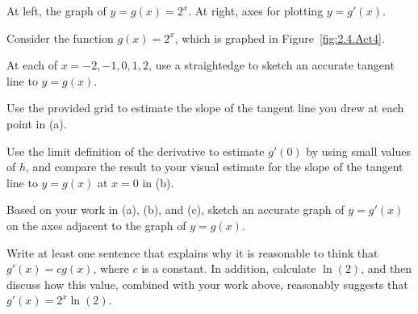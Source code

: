 \begin{marginfigure}[8cm]
\caption{At left, the graph of $y = g(x) = 2^x$. At right, axes for plotting $y = g'(x)$.} \label{fig:2.4.Act4}
\end{marginfigure}

\begin{activity} \label{A:2.4.Act4}
Consider the function $g(x) = 2^x$, which is graphed in Figure~\ref{fig:2.4.Act4}.
\ba
	\item At each of $x = -2, -1, 0, 1, 2$, use a straightedge to sketch an accurate tangent line to $y = g(x)$.
	\item Use the provided grid to estimate the slope of the tangent line you drew at each point in (a).
	\item Use the limit definition of the derivative to estimate $g'(0)$ by using small values of $h$, and compare the result to your visual estimate for the slope of the tangent line to $y = g(x)$ at $x = 0$ in (b).
	\item Based on your work in (a), (b), and (c), sketch an accurate graph of $y = g'(x)$ on the axes adjacent to the graph of $y = g(x)$.
	\item Write at least one sentence that explains why it is reasonable to think that $g'(x) = cg(x)$, where $c$ is a constant.  In addition, calculate $\ln(2)$, and then discuss how this value, combined with your work above, reasonably suggests that $g'(x) = 2^x \ln(2)$.
\ea

\end{activity} %